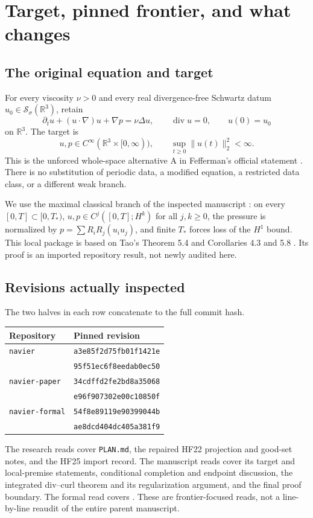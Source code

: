 \documentclass[11pt,a4paper]{article}
\theoremstyle{definition}\newtheorem{definition}[theorem]{Definition}
\theoremstyle{remark}\newtheorem{remark}[theorem]{Remark}
\newcommand{\R}{\mathbb R}
\newcommand{\norm}[1]{\lVert #1\rVert}
\newcommand{\diver}{\operatorname{div}}
\newcommand{\Sch}{\mathcal S_\sigma(\R^3)}
\newcommand{\repo}[1]{{\small\texttt{#1}}}
\numberwithin{equation}{section}
\begin{document}
\section{Target, pinned frontier, and what changes}
\label{sec:frontier}
\subsection{The original equation and target}
For every viscosity $\nu>0$ and every real divergence-free Schwartz datum $u_0\in\Sch$, retain
\begin{equation}\label{eq:NS}
 \partial_tu+(u\cdot\nabla)u+\nabla p=\nu\Delta u,
 \qquad \diver u=0,\qquad u(0)=u_0
\end{equation}
on $\R^3$. The target is
\begin{equation}\label{eq:target}
 u,p\in C^\infty(\R^3\times[0,\infty)),
 \qquad \sup_{t\ge0}\norm{u(t)}_2^2<\infty.
\end{equation}
This is the unforced whole-space alternative A in Fefferman's official statement \cite{Clay}. There is no substitution of periodic data, a modified equation, a restricted data class, or a different weak branch.

We use the maximal classical branch of the inspected manuscript \cite{Paper}: on every $[0,T]\subset[0,T_*)$, $u,p\in C^j([0,T];H^k)$ for all $j,k\ge0$, the pressure is normalized by $p=\sum R_iR_j(u_iu_j)$, and finite $T_*$ forces loss of the $H^1$ bound. This local package is based on Tao's Theorem 5.4 and Corollaries 4.3 and 5.8 \cite{Tao}. Its proof is an imported repository result, not newly audited here.

\subsection{Revisions actually inspected}
The two halves in each row concatenate to the full commit hash.
\begin{center}\begin{tabular}{@{}lp{98mm}@{}}\toprule
Repository & Pinned revision\\\midrule
\repo{navier} & \repo{a3e85f2d75fb01f1421e}\\[-2pt]
 & \repo{95f51ec6f8eedab0ec50}\\
\repo{navier-paper} & \repo{34cdffd2fe2bd8a35068}\\[-2pt]
 & \repo{e96f907302e00c10850f}\\
\repo{navier-formal} & \repo{54f8e89119e90399044b}\\[-2pt]
 & \repo{ae8dcd404dc405a381f9}\\\bottomrule
\end{tabular}\end{center}
The research reads cover \repo{PLAN.md}, the repaired HF22 projection and good-set notes, and the HF25 import record. The manuscript reads cover its target and local-premise statements, conditional completion and endpoint discussion, the integrated div--curl theorem and its regularization argument, and the final proof boundary. The formal read covers . These are frontier-focused reads, not a line-by-line reaudit of the entire parent manuscript.
\end{document}
